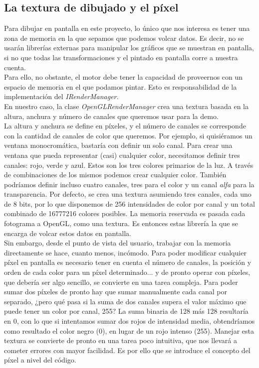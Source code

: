 \subsection{La textura de dibujado y el píxel}

Para dibujar en pantalla en este proyecto, lo único que nos interesa es tener una zona de memoria en la que sepamos que podemos volcar datos. Es decir, no se usarán librerías externas para manipular los gráficos que se muestran en pantalla, si no que todas las transformaciones y el pintado en pantalla corre a nuestra cuenta.\\

Para ello, no obstante, el motor debe tener la capacidad de proveernos con un espacio de memoria en el que podamos pintar. Esto es responsabilidad de la implementación del \emph{IRenderManager.}\\

En nuestro caso, la clase \emph{OpenGLRenderManager} crea una textura basada en la altura, anchura y número de canales que queremos usar para la demo.\\

La altura y anchura se define en píxeles, y el número de canales se corresponde con la cantidad de canales de color que queremos. Por ejemplo, si quisiéramos un ventana monocromática, bastaría con definir un solo canal. Para crear una ventana que pueda representar (casi) cualquier color, necesitamos definir tres canales: rojo, verde y azul. Estos son los tres colores primarios de la luz. A través de combinaciones de los mismos podemos crear cualquier color. También podríamos definir incluso cuatro canales, tres para el color y un canal \emph{alfa} para la transparencia. Por defecto, se crea una textura asumiendo tres canales, cada uno de 8 bits, por lo que disponemos de 256 intensidades de color por canal y un total combinado de 16777216 colores posibles. La memoria reservada es pasada cada fotograma a OpenGL, como una textura. Es entonces estas librería la que se encarga de volcar estos datos en pantalla.\\

Sin embargo, desde el punto de vista del usuario, trabajar con la memoria directamente se hace, cuanto menos, incómodo. Para poder modificar cualquier píxel en pantalla es necesario tener en cuenta el número de canales, la posición y orden de cada color para un píxel determinado... y de pronto operar con píxeles, que debería ser algo sencillo, se convierte en una tarea compleja. Para poder sumar dos píxeles de pronto hay que sumar manualmente cada canal por separado, ¿pero qué pasa si la suma de dos canales supera el valor máximo que puede tener un color por canal, 255? La suma binaria de 128 más 128 resultaría en 0, con lo que si intentamos sumar dos rojos de intensidad media, obtendríamos como resultado el color negro (0), en lugar de un rojo intenso (255). Manejar esta textura se convierte de pronto en una tarea poco intuitiva, que nos llevará a cometer errores con mayor facilidad. Es por ello que se introduce el concepto del píxel a nivel del código.\\


